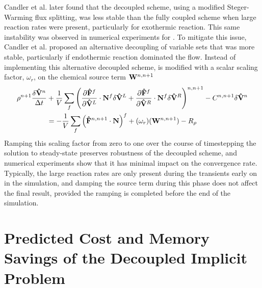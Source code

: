 Candler et al.\cite{candler2013analysis} later found that the decoupled scheme,
using a modified Steger-Warming flux splitting, was less stable than the fully
coupled scheme when large reaction rates were present, particularly for
exothermic reaction.  This same instability was observed in numerical
experiments for .  To mitigate this issue, Candler et
al. proposed an alternative decoupling of variable sets that was more stable,
particularly if endothermic reaction dominated the flow.  Instead of
implementing this alternative decoupled scheme,  is
modified with a scalar scaling factor, $\omega_r$, on the chemical source term
$\mathbf W^{n,n+1}$
\begin{equation} 
  \begin{split}
    \rho^{n+1} \frac{\delta \mathbf{\hat{V}}^n}{\Delta t}
    &+\frac{1}{V}
    \sum\limits_{f}^{}{
     \left(
       \frac{\partial \mathbf{\hat{F}}^f}{\partial \mathbf{\hat{V}}^L} \cdot \mathbf{N}^f \delta \mathbf{\hat{V}}^L
       + \frac{\partial \mathbf{\hat{F}}^f}{\partial \mathbf{\hat{V}}^R} \cdot \mathbf{N}^f \delta \mathbf{\hat{V}}^R
      \right)^{n,n+1}}
     - C^{n,n+1} \delta \mathbf{\hat{V}}^n \\
    &= 
    -\frac{1}{V}\sum\limits_{f}^{}{
      \left( \mathbf{\hat{F}}^{n,n+1} \cdot \mathbf{N} \right)^f
    } + (\omega_r) (\mathbf W^{n,n+1}) - R_\rho
  \end{split}
  \label{decoupled-with-scaling}
\end{equation}
Ramping this scaling factor from zero to one over the course of timestepping the
solution to steady-state preserves robustness of the decoupled scheme, and
numerical experiments show that it has minimal impact on the convergence rate.
Typically, the large reaction rates are only present during the transients early
on in the simulation, and damping the source term during this phase does not
affect the final result, provided the ramping is completed before the end of the
simulation.

\section{Predicted Cost and Memory Savings of the Decoupled Implicit Problem}
\label{sec:predicted-cost-mem-savings}

